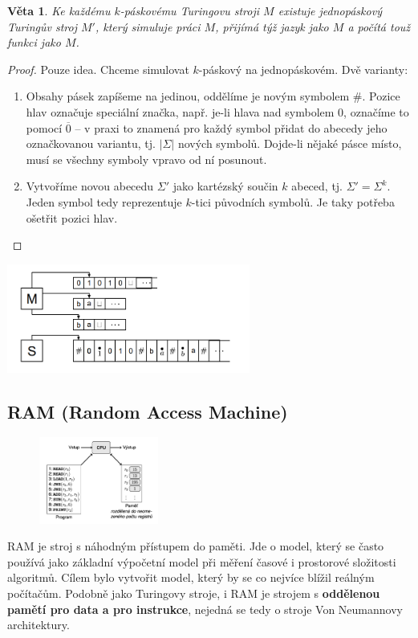 \documentclass[11pt]{report} %
\newtheorem{theorem}{Věta}[section]
\begin{document}
\begin{theorem}
Ke každému $k$-páskovému Turingovu stroji $M$ existuje jednopáskový Turingův stroj $M'$, který simuluje práci $M$, přijímá týž jazyk jako $M$ a počítá touž funkci jako $M$.
\end{theorem}
\begin{proof}
	Pouze idea. Chceme simulovat $k$-páskový na jednopáskovém. Dvě varianty:
	\begin{enumerate}
		\leftskip 40pt
		\setlength{\itemsep}{0pt}
		\item Obsahy pásek zapíšeme na jedinou, oddělíme je novým symbolem $\#$. Pozice hlav označuje speciální značka, např. je-li hlava nad symbolem $0$, označíme to pomocí $\overline{0}$ -- v praxi to znamená pro každý symbol přidat do abecedy jeho označkovanou variantu, tj. $|\Sigma|$ nových symbolů. Dojde-li nějaké pásce místo, musí se všechny symboly vpravo od ní posunout.
		
		\item Vytvoříme novou abecedu $\Sigma'$ jako kartézský součin $k$ abeced, tj. $\Sigma' = \Sigma^k$. Jeden symbol tedy reprezentuje $k$-tici původních symbolů. Je taky potřeba ošetřit pozici hlav.
	\end{enumerate}
\end{proof}

\includegraphics[width=0.6\textwidth]{img/turing_multi_seq.png}

\subsection{RAM (Random Access Machine)}
\begin{figure}
	\centering
	\includegraphics[width=0.35\textwidth]{img/ram.png}
\end{figure}
RAM je stroj s náhodným přístupem do paměti. Jde o model, který se často používá jako základní výpočetní model při měření časové i prostorové složitosti algoritmů. Cílem bylo vytvořit model, který by se co nejvíce blížil reálným počítačům. Podobně jako Turingovy stroje, i RAM je strojem s \textbf{oddělenou pamětí pro data a pro instrukce}, nejedná se tedy o stroje Von Neumannovy architektury. 
\end{document}
